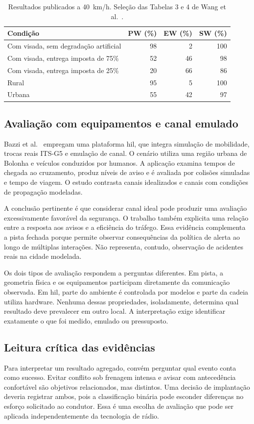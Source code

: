\documentclass[conference,a4paper]{IEEEtran}
\begin{document}
\begin{table}[t]
\centering
\caption{Resultados publicados a 40~km/h. Seleção das Tabelas 3 e 4 de Wang et al.~\cite{wang2021}.}
\label{tab:caso}
\small
\begin{tabularx}{\columnwidth}{Yrrr}
\toprule
Condição & PW (\%) & EW (\%) & SW (\%)\\
\midrule
Com visada, sem degradação artificial & 98 & 2 & 100\\
Com visada, entrega imposta de 75\% & 52 & 46 & 98\\
Com visada, entrega imposta de 25\% & 20 & 66 & 86\\
Rural & 95 & 5 & 100\\
Urbana & 55 & 42 & 97\\
\bottomrule
\end{tabularx}
\end{table}

\subsection{Avaliação com equipamentos e canal emulado}
Bazzi et al.~\cite{bazzi2020} empregam uma plataforma \ac{hil}, que integra simulação de mobilidade, trocas reais ITS-G5 e emulação de canal. O cenário utiliza uma região urbana de Bolonha e veículos conduzidos por humanos. A aplicação examina tempos de chegada ao cruzamento, produz níveis de aviso e é avaliada por colisões simuladas e tempo de viagem. O estudo contrasta canais idealizados e canais com condições de propagação modeladas.

A conclusão pertinente é que considerar canal ideal pode produzir uma avaliação excessivamente favorável da segurança. O trabalho também explicita uma relação entre a resposta aos avisos e a eficiência do tráfego. Essa evidência complementa a pista fechada porque permite observar consequências da política de alerta ao longo de múltiplas interações. Não representa, contudo, observação de acidentes reais na cidade modelada.

Os dois tipos de avaliação respondem a perguntas diferentes. Em pista, a geometria física e os equipamentos participam diretamente da comunicação observada. Em \ac{hil}, parte do ambiente é controlada por modelos e parte da cadeia utiliza hardware. Nenhuma dessas propriedades, isoladamente, determina qual resultado deve prevalecer em outro local. A interpretação exige identificar exatamente o que foi medido, emulado ou pressuposto.

\subsection{Leitura crítica das evidências}
Para interpretar um resultado agregado, convém perguntar qual evento conta como sucesso. Evitar conflito sob frenagem intensa e avisar com antecedência confortável são objetivos relacionados, mas distintos. Uma decisão de implantação deveria registrar ambos, pois a classificação binária pode esconder diferenças no esforço solicitado ao condutor. Essa é uma escolha de avaliação que pode ser aplicada independentemente da tecnologia de rádio.
\end{document}
